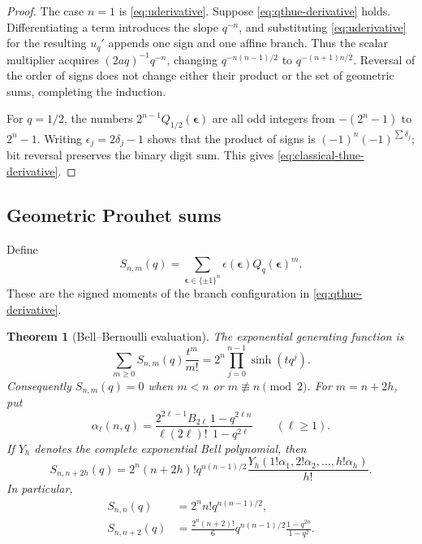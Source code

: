 \documentclass[11pt,oneside]{article}
\newtheorem{theorem}{Theorem}[section]
\theoremstyle{definition}
\theoremstyle{remark}
\begin{document}
\begin{proof}
The case $n=1$ is \eqref{eq:uderivative}.  Suppose \eqref{eq:qthue-derivative} holds.
Differentiating a term introduces the slope $q^{-n}$, and substituting
\eqref{eq:uderivative} for the resulting $u_q'$ appends one sign and one affine branch.
Thus the scalar multiplier acquires $(2aq)^{-1}q^{-n}$, changing
$q^{-n(n-1)/2}$ to $q^{-(n+1)n/2}$.  Reversal of the order of signs does not change
either their product or the set of geometric sums, completing the induction.

For $q=1/2$, the numbers
$2^{n-1}Q_{1/2}(\boldsymbol\epsilon)$ are all odd integers from
$-(2^n-1)$ to $2^n-1$.  Writing $\epsilon_j=2\delta_j-1$ shows that the product of
signs is $(-1)^n(-1)^{\sum\delta_j}$; bit reversal preserves the binary digit sum.
This gives \eqref{eq:classical-thue-derivative}.
\end{proof}

\subsection{Geometric Prouhet sums}

Define
\begin{equation}
 S_{n,m}(q)=\sum_{\boldsymbol\epsilon\in\{\pm1\}^n}
 \epsilon(\boldsymbol\epsilon)Q_q(\boldsymbol\epsilon)^m.
 \label{eq:Snm-def}
\end{equation}
These are the signed moments of the branch configuration in
\eqref{eq:qthue-derivative}.

\begin{theorem}[Bell--Bernoulli evaluation]
\label{thm:geometric-prouhet}
The exponential generating function is
\begin{equation}
 \sum_{m\ge0}S_{n,m}(q)\frac{t^m}{m!}
 =2^n\prod_{j=0}^{n-1}\sinh(tq^j).
 \label{eq:Snm-egf}
\end{equation}
Consequently $S_{n,m}(q)=0$ when $m<n$ or $m\not\equiv n\pmod2$.  For $m=n+2h$,
put
\begin{equation}
 \alpha_\ell(n,q)=
 \frac{2^{2\ell-1}B_{2\ell}}{\ell(2\ell)!}
 \frac{1-q^{2\ell n}}{1-q^{2\ell}}
 \qquad(\ell\ge1).
 \label{eq:alpha-def}
\end{equation}
If $Y_h$ denotes the complete exponential Bell polynomial, then
\begin{equation}
 S_{n,n+2h}(q)=
 2^n(n+2h)!q^{n(n-1)/2}
 \frac{Y_h(1!\alpha_1,2!\alpha_2,\dots,h!\alpha_h)}{h!}.
 \label{eq:Snm-bell}
\end{equation}
In particular,
\begin{align}
 S_{n,n}(q)&=2^n n!q^{n(n-1)/2},\\
 S_{n,n+2}(q)&=
 \frac{2^n(n+2)!}{6}q^{n(n-1)/2}
 \frac{1-q^{2n}}{1-q^2}.
\end{align}
\end{theorem}
\end{document}
